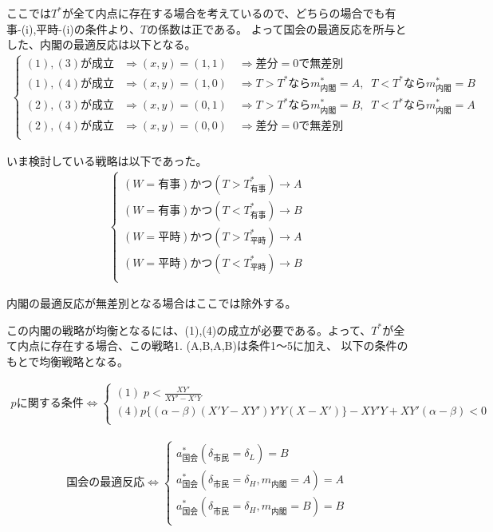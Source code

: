 \documentclass[main.tex]{subfiles}
\begin{document}
ここでは$T^*$が全て内点に存在する場合を考えているので、どちらの場合でも有事-(i),平時-(i)の条件より、$T$の係数は正である。
よって国会の最適反応を所与とした、内閣の最適反応は以下となる。
\begin{align*}
    \begin{cases}
        (1),(3)が成立 &\Rightarrow (x,y)=(1,1) \quad \Rightarrow 差分=0で無差別\\
        (1),(4)が成立 &\Rightarrow (x,y)=(1,0) \quad \Rightarrow T>T^* なら m^*_{内閣}=A,\;\; T<T^* なら m^*_{内閣}=B\\
        (2),(3)が成立 &\Rightarrow (x,y)=(0,1) \quad \Rightarrow T>T^* なら m^*_{内閣}=B,\;\; T<T^* なら m^*_{内閣}=A\\
        (2),(4)が成立 &\Rightarrow (x,y)=(0,0) \quad \Rightarrow 差分=0で無差別\\
     \end{cases}
\end{align*}

いま検討している戦略は以下であった。
\begin{align*}
    \begin{cases}
        (W=有事) かつ (T>T^*_{有事})  \rightarrow A\\
        (W=有事) かつ (T<T^*_{有事})  \rightarrow B\\
        (W=平時) かつ (T>T^*_{平時})  \rightarrow A\\
        (W=平時) かつ (T<T^*_{平時})   \rightarrow B\\
    \end{cases}
\end{align*}

内閣の最適反応が無差別となる場合はここでは除外する。

この内閣の戦略が均衡となるには、(1),(4)の成立が必要である。よって、$T^*$が全て内点に存在する場合、この戦略1. (A,B,A,B)は条件1〜5に加え、
以下の条件のもとで均衡戦略となる。


\begin{align*}
    p\text{に関する条件} \Leftrightarrow 
    \begin{cases}
        (1)\; p < \frac{XY'}{XY' - X'Y} \\[0.5em]
        (4) p \{ (\alpha - \beta)( X'Y- XY')Y'Y(X - X')  \} -XY'Y + XY'(\alpha - \beta) < 0 \\[0.5em] 
     \end{cases}
\end{align*}

\begin{align*}
    \text{国会の最適反応} \Leftrightarrow 
    \begin{cases}
        a^*_{国会}(\delta_{市民}=\delta_L) = B \\[0.5em]
        a^*_{国会}(\delta_{市民}=\delta_H, m_{内閣} = A) = A \\[0.5em]
        a^*_{国会}(\delta_{市民}=\delta_H, m_{内閣} = B) = B \\[0.5em]
     \end{cases}
\end{align*}
\end{document}
